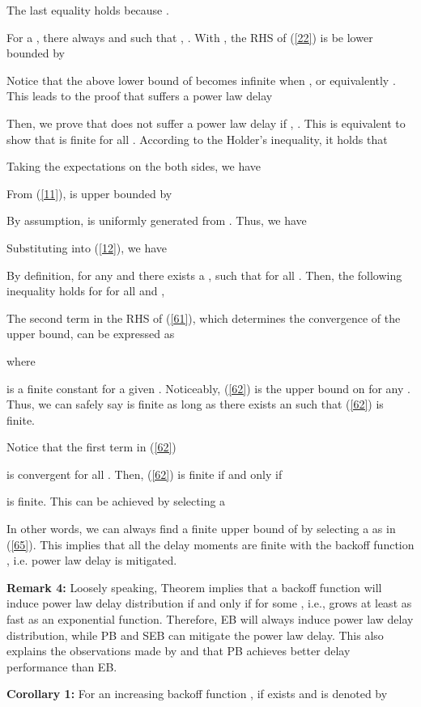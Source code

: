 \documentclass[journal]{IEEEtran}
\begin{document}
The last equality holds because .

For a , there always  and  such that , . With , the RHS of (\ref{22}) is be lower bounded by

Notice that the above lower bound of  becomes infinite when , or equivalently . This leads to the proof that  suffers a power law delay

Then, we prove that  does not suffer a power law delay if , . This is equivalent to show that  is finite for all . According to the Holder's inequality, it holds that

Taking the expectations on the both sides, we have

From (\ref{11}),  is upper bounded by

By assumption,  is uniformly generated from . Thus, we have

Substituting  into (\ref{12}), we have


By definition, for any  and  there exists a , such that  for all . Then, the following inequality holds for for all  and ,

The second term in the RHS of (\ref{61}), which determines the convergence of the upper bound, can be expressed as

where

is a finite constant for a given . Noticeably, (\ref{62}) is the upper bound on  for any . Thus, we can safely say  is finite as long as there exists an  such that (\ref{62}) is finite.

Notice that the first term in (\ref{62})

is convergent for all . Then, (\ref{62}) is finite if and only if

is finite. This can be achieved by selecting a

In other words,  we can always find a finite upper bound of  by selecting a  as in (\ref{65}). This implies that all the delay moments are finite with the backoff function , i.e. power law delay is mitigated. 

\textbf{Remark 4:} Loosely speaking, Theorem  implies that a backoff function  will induce power law delay distribution if and only if  for some , i.e.,  grows at least as fast as an exponential function. Therefore, EB will always induce power law delay distribution, while PB and SEB can mitigate the power law delay. This also explains the observations made by \cite{2008:Xu} and \cite{2011:Sun} that PB achieves better delay performance than EB.

\textbf{Corollary 1:} For an increasing backoff function , if  exists and is denoted by
\end{document}
